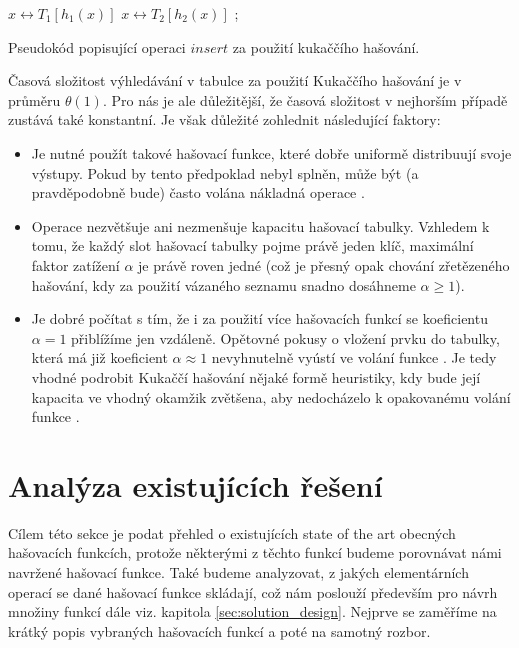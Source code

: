 \begin{algorithm}
\begin{algorithmic}
	\Repeat
		\State $x \leftrightarrow T_1[h_1(x)]$
		 \Return \EndIf
		\State $x \leftrightarrow T_2[h_2(x)]$
		 \Return \EndIf
	\State {}; 
\EndFunction
\end{algorithmic}
\caption{Pseudokód popisující operaci $insert$ za použití kukaččího hašování.}
\label{alg:cuckoo_hashing}
\end{algorithm}

Časová složitost výhledávání v tabulce za použití Kukaččího hašování je v průměru $\theta(1)$. Pro nás je ale
důležitější, že časová složitost v nejhorším případě zustává také konstantní. Je však důležité zohlednit 
následující faktory:
\begin{itemize}
	\item Je nutné použít takové hašovací funkce, které dobře uniformě distribuují svoje výstupy. Pokud by tento
	předpoklad nebyl splněn, může být (a pravděpodobně bude) často volána nákladná operace .

	\item Operace  nezvětšuje ani nezmenšuje kapacitu hašovací tabulky. Vzhledem k tomu, že každý slot
	hašovací tabulky pojme právě jeden klíč, maximální faktor zatížení $\alpha$ je právě roven jedné (což je přesný
	opak chování zřetězeného hašování, kdy za použití vázaného seznamu snadno dosáhneme $\alpha \geq 1$).

	\item Je dobré počítat s tím, že i za použití více hašovacích funkcí se koeficientu $\alpha = 1$ přiblížíme jen
	vzdáleně. Opětovné pokusy o vložení prvku do tabulky, která má již koeficient $\alpha \approx 1$ nevyhnutelně
	vyústí ve volání funkce . Je tedy vhodné podrobit Kukaččí hašování nějaké formě heuristiky, kdy
	bude její kapacita ve vhodný okamžik zvětšena, aby nedocházelo k opakovanému volání funkce .
\end{itemize}

\section{Analýza existujících řešení}
Cílem této sekce je podat přehled o existujících state of the art obecných hašovacích funkcích, protože některými z těchto
funkcí budeme porovnávat námi navržené hašovací funkce. Také budeme analyzovat, z jakých elementárních operací se 
dané hašovací funkce skládají, což nám poslouží především pro návrh množiny funkcí dále viz. kapitola  
\ref{sec:solution_design}. Nejprve se zaměříme na krátký popis vybraných hašovacích funkcí a poté na samotný rozbor.

